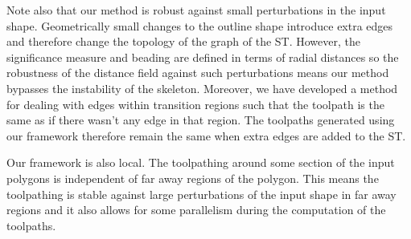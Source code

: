 Note also that our method is robust against small perturbations in the input shape.
Geometrically small changes to the outline shape introduce extra edges and therefore change the topology of the graph of the ST.
However, the significance measure and beading are defined in terms of radial distances so the robustness of the distance field against such perturbations means our method bypasses the instability of the skeleton.
Moreover, we have developed a method for dealing with edges within transition regions such that the toolpath is the same as if there wasn't any edge in that region.
The toolpaths generated using our framework therefore remain the same when extra edges are added to the ST.

Our framework is also local.
The toolpathing around some section of the input polygons is independent of far away regions of the polygon.
This means the toolpathing is stable against large perturbations of the input shape in far away regions
and it also allows for some parallelism during the computation of the toolpaths.


